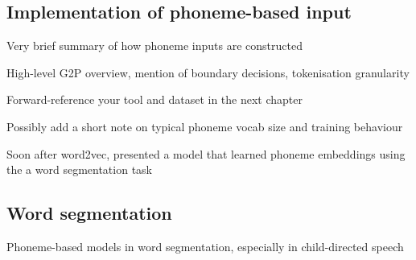 \subsection{Implementation of phoneme-based input}





Very brief summary of how phoneme inputs are constructed

High-level G2P overview, mention of boundary decisions, tokenisation granularity

Forward-reference your tool and dataset in the next chapter

Possibly add a short note on typical phoneme vocab size and training behaviour


Soon after word2vec, \citet{ma2016learning} presented a model that learned phoneme embeddings using the  a word segmentation task

\subsection{Word segmentation}

Phoneme-based models in word segmentation, especially in child-directed speech

